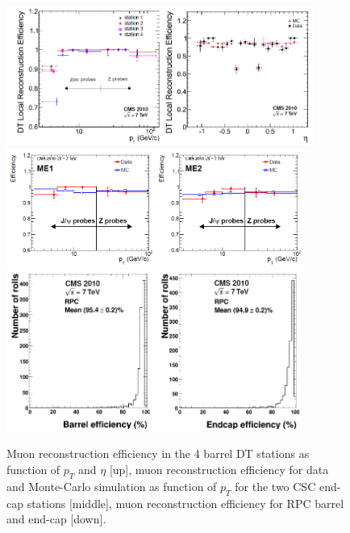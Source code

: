 \begin{figure}[!Hhtbp]
  \begin{center}
    \includegraphics[width=0.9\textwidth, height=0.3\textheight]{figs/DT_Eff.png}
    \includegraphics[width=0.87\textwidth, height=0.3\textheight]{figs/CSC_Eff.png}
    \includegraphics[width=0.86\textwidth, height=0.3\textheight]{figs/RPC_Eff.png}
    \caption{Muon reconstruction efficiency in the 4 barrel DT stations as function of $p_{T}$ and $\eta$ [up], muon reconstruction efficiency for data and Monte-Carlo simulation as function of $p_{T}$ for the two CSC end-cap stations [middle], muon reconstruction efficiency for RPC barrel and end-cap [down].}
    \label{fig:MuonEff}
  \end{center}
\end{figure}

